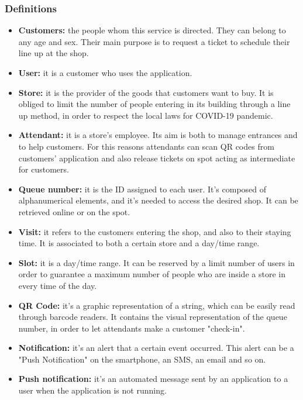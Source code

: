 \documentclass[table, 12pt]{article}
\begin{document}
\subsubsection{Definitions}
\begin{itemize}
    \item {\textbf{Customers:} the people whom this service is directed. They can belong to any age and sex. Their main purpose is to request a ticket to schedule their line up at the shop.}
    \item {\textbf{User:} it is a customer who uses the application. }\label{User}
    \item {\textbf{Store:} it is the provider of the goods that customers want to buy. It is obliged to limit the number of people entering in its building through a line up method, in order to respect the local laws for COVID-19 pandemic.}
    \item {\textbf{Attendant:} it is a store's employee. Its aim is both to manage entrances and to help customers. For this reasons attendants can scan QR codes from customers' application and also release tickets on spot acting as intermediate for customers.}
    \item {\textbf{Queue number:} it is the ID assigned to each user. It's composed of alphanumerical elements, and it's needed to access the desired shop. It can be retrieved online or on the spot.}
    \item {\textbf{Visit:} it refers to the customers entering the shop, and also to their staying time. It is associated to both a certain store and a day/time range.}
    \item {\textbf{Slot:} it is a day/time range. It can be reserved by a limit number of users in order to guarantee a maximum number of people who are inside a store in every time of the day.}
    \item {\textbf{QR Code:} it's a graphic representation of a string, which can be easily read through barcode readers. It contains the visual representation of the queue number, in order to let attendants make a customer "check-in".}\label{QR}
    \item {\textbf{Notification:} it's an alert that a certain event occurred. This alert can be a "Push Notification" on the smartphone, an SMS, an email and so on.}
    \item {\textbf{Push notification:} it's an automated message sent by an application to a user when the application is not running.}
\end{itemize}
\end{document}
